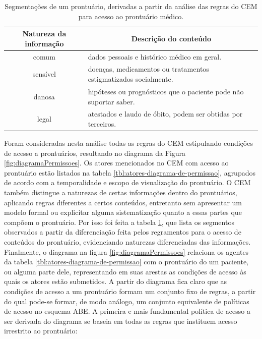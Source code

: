\documentclass[a4paper,11pt]{article}
\newcommand*{\centerhead}[1]{\multicolumn{1}{|c|}{#1}}
\begin{document}
\begin{table}[h]
  \begin{center}
    \begin{tabular}{ |c|l| }
      \hline
      Natureza da informação & \centerhead{Descrição do conteúdo} \\
      \hline
      comum & dados pessoais e histórico médico em geral. \\
      \hline
      sensível & doenças, medicamentos ou tratamentos estigmatizados socialmente. \\
      \hline
      danosa  & hipóteses ou prognósticos que o paciente pode não suportar saber. \\
      \hline
      legal & atestados e laudo de óbito, podem ser obtidas por terceiros. \\
      \hline
    \end{tabular}
  \caption{Segmentações de um prontuário, derivadas a partir da análise das regras do CEM para acesso ao prontuário médico.}
  \label{tbl:segmentacoes-prontuario}
\end{center}
\end{table}

Foram consideradas nesta análise todas as regras do CEM estipulando condições de acesso a prontuários, resultando no diagrama da Figura \ref{fig:diagramaPermissoes}.
Os atores mencionados no CEM com acesso ao prontuário estão listados na tabela \ref{tbl:atores-diagrama-de-permissao}, agrupados de acordo com a temporalidade e escopo de visualização do prontuário.
O CEM também distingue a naturezas de certas informações dentro do prontuários, aplicando regras diferentes a certos conteúdos, entretanto sem apresentar um modelo formal ou explicitar alguma sistematização quanto a essas partes que compõem o prontuário.
Por isso foi feita a tabela \ref{tbl:segmentacoes-prontuario}, que lista os segmentos observados a partir da diferenciação feita pelos regramentos para o acesso de conteúdos do prontuário, evidenciando naturezas diferenciadas das informações.
Finalmente, o diagrama na figura \ref{fig:diagramaPermissoes} relaciona os agentes da tabela \ref{tbl:atores-diagrama-de-permissao} com o prontuário do um paciente, ou alguma parte dele, representando em suas arestas as condições de acesso às quais os atores estão submetidos.
A partir do diagrama fica claro que as condições de acesso a um prontuário formam um conjunto fixo de regras, a partir do qual pode-se formar, de modo análogo, um conjunto equivalente de políticas de acesso no esquema ABE.
A primeira e mais fundamental política de acesso a ser derivada do diagrama se baseia em todas as regras que instituem acesso irrestrito ao prontuário:
\end{document}

